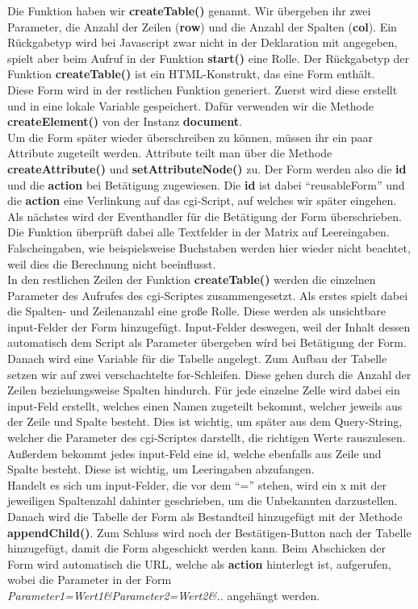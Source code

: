 \documentclass[a4paper,oneside,titlepage,12pt]{article}
\begin{document}
Die Funktion haben wir \textbf{createTable()} genannt. Wir übergeben ihr zwei Parameter, die Anzahl der Zeilen (\textbf{row}) und die Anzahl der Spalten (\textbf{col}). Ein Rückgabetyp wird bei Javascript zwar nicht in der Deklaration mit angegeben, spielt aber beim Aufruf in der Funktion \textbf{start()} eine Rolle. Der Rückgabetyp der Funktion \textbf{createTable()} ist ein HTML-Konstrukt, das eine Form enthält. \\ Diese Form wird in der restlichen Funktion generiert. Zuerst wird diese erstellt und in eine lokale Variable gespeichert. Dafür verwenden wir die Methode \textbf{createElement()} von der Instanz \textbf{document}. \\ Um die Form später wieder überschreiben zu können, müssen ihr ein paar Attribute zugeteilt werden. Attribute teilt man über die Methode \textbf{createAttribute()} und \textbf{setAttributeNode()} zu. Der Form werden also die \textbf{id} und die \textbf{action} bei Betätigung zugewiesen. Die \textbf{id} ist dabei ``reusableForm'' und die \textbf{action} eine Verlinkung auf das cgi-Script, auf welches wir später eingehen. \\ Als nächstes wird der Eventhandler für die Betätigung der Form überschrieben. Die Funktion überprüft dabei alle Textfelder in der Matrix auf Leereingaben. Falscheingaben, wie beispielsweise Buchstaben werden hier wieder nicht beachtet, weil dies die Berechnung nicht beeinflusst. \\ In den restlichen Zeilen der Funktion \textbf{createTable()} werden die einzelnen Parameter des Aufrufes des cgi-Scriptes zusammengesetzt. Als erstes spielt dabei die Spalten- und Zeilenanzahl eine große Rolle. Diese werden als unsichtbare input-Felder der Form hinzugefügt. Input-Felder deswegen, weil der Inhalt dessen automatisch dem Script als Parameter übergeben wírd bei Betätigung der Form. \\ 
Danach wird eine Variable für die Tabelle angelegt. Zum Aufbau der Tabelle setzen wir auf zwei verschachtelte for-Schleifen. Diese gehen durch die Anzahl der Zeilen beziehungsweise Spalten hindurch. Für jede einzelne Zelle wird dabei ein input-Feld erstellt, welches einen Namen zugeteilt bekommt, welcher jeweils aus der Zeile und Spalte besteht. Dies ist wichtig, um später aus dem Query-String, welcher die Parameter des cgi-Scriptes darstellt, die richtigen Werte rauszulesen. Außerdem bekommt jedes input-Feld eine id, welche ebenfalls aus Zeile und Spalte besteht. Diese ist wichtig, um Leeringaben abzufangen. \\
Handelt es sich um input-Felder, die vor dem ``='' stehen, wird ein x mit der jeweiligen Spaltenzahl dahinter geschrieben, um die Unbekannten darzustellen. \\ Danach wird die Tabelle der Form als Bestandteil hinzugefügt mit der Methode \textbf{appendChild()}. Zum Schluss wird noch der Bestätigen-Button nach der Tabelle hinzugefügt, damit die Form abgeschickt werden kann. Beim Abschicken der Form wird automatisch die URL, welche als \textbf{action} hinterlegt ist, aufgerufen, wobei die Parameter in der Form \\ \textit{Parameter1=Wert1\&Parameter2=Wert2\&..} angehängt werden. \\ 
\end{document}
